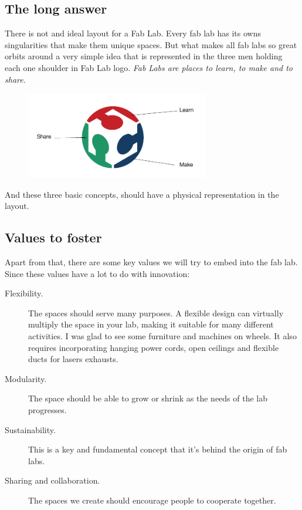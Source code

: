 \documentclass[a4paper,12pt,titlepage]{article}
\begin{document}
\subsection{The long answer}
There is not and ideal layout for a Fab Lab. Every fab lab has its owns singularities that make
them unique spaces. But what makes all fab labs so great orbits around a very simple idea that
is represented in the three men holding each one shoulder in Fab Lab logo. \textit{Fab Labs are
places to learn, to make and to share}. 

\begin{figure}[h] %
   \centering
   \includegraphics[width=8cm]{files/learn-make-share} 
\end{figure}

And these three basic concepts, should have a physical representation in the layout. 

\subsection{Values to foster}
Apart from that, there are some key values we will try to embed into the fab lab.
Since these values have a lot to do with innovation:

\begin{description}
\item[Flexibility.] The spaces should serve many purposes. A flexible design can virtually multiply
the space in your lab, making it suitable for many different activities. I was glad to see some
furniture and machines on wheels. It also requires incorporating hanging power cords, open
ceilings and flexible ducts for lasers exhausts.
\item[Modularity.] The space should be able to grow or shrink as the needs of the lab progresses.
\item[Sustainability.] This is a key and fundamental concept that it's behind the origin of fab labs.
\item[Sharing and collaboration.] The spaces we create should encourage people to cooperate
together.
\end{description}
\end{document}
